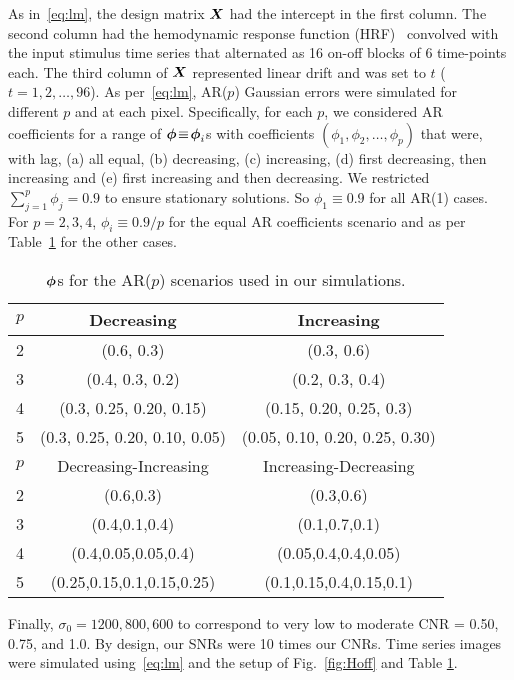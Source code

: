 As in~\eqref{eq:lm}, the design matrix $\boldsymbol{X}$ had the intercept in the
first column. The second column had the hemodynamic response function
(HRF)~\citep{lindquist08} convolved with the input stimulus time
series that alternated as 16 on-off blocks of 6 time-points
each. %
The third column of $\boldsymbol{X}$ represented linear drift and was set to $t$
($t\!=\!1,2,\ldots,96$). As per~\eqref{eq:lm}, AR($p$) Gaussian errors were
simulated for different $p$ and at each pixel. Specifically, for each $p$, we considered AR
coefficients for a range of $\boldsymbol{\phi}\!\equiv\!\boldsymbol{\phi}_i$s with  coefficients
$(\phi_1,\phi_2,\ldots,\phi_p)$ that were, with lag,  (a) all equal, (b)
decreasing, (c) increasing, (d) first decreasing, 
then increasing and (e) first increasing and then decreasing. We
restricted $\sum^p_{j=1}\phi_{j} = 0.9$ to ensure stationary
solutions. So $\phi_1\equiv0.9$ for all AR(1) cases. For $p\!=\!2,3,4$,
$\phi_i\equiv 0.9/p$ for the equal AR coefficients scenario and as per 
Table~\ref{tab:Phivalues} for the other cases.
\begin{table}[htbp]
\caption[PhiValuesSimulation]{$\boldsymbol{\phi}$s for the AR($p$)
  scenarios used in our simulations.}\label{tab:Phivalues}
\centering
\begin{tabular}{|c|c|c|}
\hline
$p$ & Decreasing  & Increasing \\  
\hline
2  & (0.6, 0.3) & (0.3, 0.6) \\
3  & (0.4, 0.3, 0.2) & (0.2, 0.3, 0.4) \\
4  & (0.3, 0.25, 0.20, 0.15)& (0.15, 0.20, 0.25, 0.3) \\
5  & (0.3, 0.25, 0.20, 0.10, 0.05) & (0.05, 0.10, 0.20, 0.25, 0.30) \\
\hline
\hline
$p$ & Decreasing-Increasing & Increasing-Decreasing  \\  
\hline
2  & (0.6,0.3) & (0.3,0.6)\\
3  & (0.4,0.1,0.4) & (0.1,0.7,0.1) \\
4  & (0.4,0.05,0.05,0.4)&(0.05,0.4,0.4,0.05) \\
5  & (0.25,0.15,0.1,0.15,0.25) & (0.1,0.15,0.4,0.15,0.1)\\
\hline
\end{tabular}
\end{table}
Finally,  $\sigma_0 = 1200, 800, 600$ to correspond to very low to
moderate CNR = 0.50, 0.75, and 1.0. By design, our SNRs were 10 times
our CNRs. Time series images were
simulated using~\eqref{eq:lm} and the setup of Fig.~\ref{fig:Hoff} and
Table \ref{tab:Phivalues}. 


